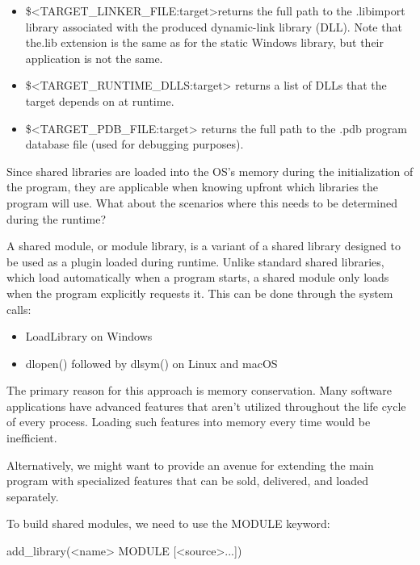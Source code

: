 \begin{itemize}
\item
\$<TARGET\_LINKER\_FILE:target>returns the full path to the .libimport library associated with the produced dynamic-link library (DLL). Note that the.lib extension is the same as for the static Windows library, but their application is not the same.

\item
\$<TARGET\_RUNTIME\_DLLS:target> returns a list of DLLs that the target depends on at runtime.

\item
\$<TARGET\_PDB\_FILE:target> returns the full path to the .pdb program database file (used for debugging purposes).
\end{itemize}

Since shared libraries are loaded into the OS’s memory during the initialization of the program, they are applicable when knowing upfront which libraries the program will use. What about the scenarios where this needs to be determined during the runtime?


A shared module, or module library, is a variant of a shared library designed to be used as a plugin loaded during runtime. Unlike standard shared libraries, which load automatically when a program starts, a shared module only loads when the program explicitly requests it. This can be done through the system calls:

\begin{itemize}
\item
LoadLibrary on Windows

\item
dlopen() followed by dlsym() on Linux and macOS
\end{itemize}

The primary reason for this approach is memory conservation. Many software applications have advanced features that aren’t utilized throughout the life cycle of every process. Loading such features into memory every time would be inefficient.

Alternatively, we might want to provide an avenue for extending the main program with specialized features that can be sold, delivered, and loaded separately.

To build shared modules, we need to use the MODULE keyword:

\begin{shell}
add_library(<name> MODULE [<source>...])
\end{shell}

